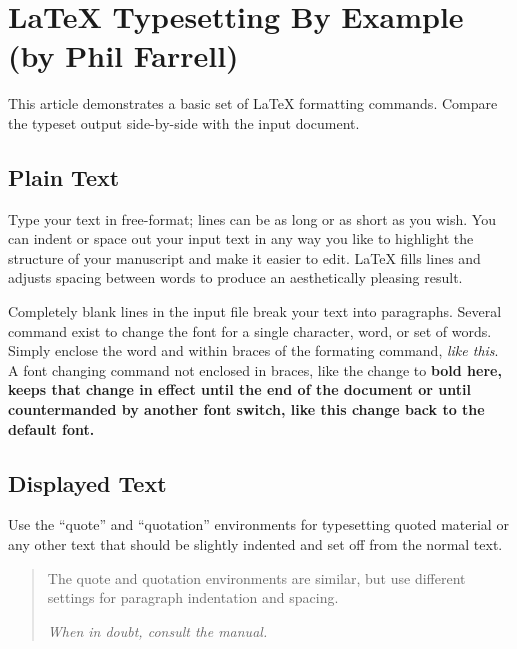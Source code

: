 %
\section{LaTeX Typesetting By Example (by Phil Farrell)}
This article demonstrates a basic set of LaTeX formatting commands.
Compare the typeset output side-by-side with the input document.

\subsection{Plain Text}
Type your text in free-format; lines can be as long
or as short
as you wish.
        You can indent         or space out
        your input 
            text in 
                any way you like to highlight the structure
        of your manuscript and make it easier to edit.
LaTeX fills lines and adjusts spacing between words to produce an
aesthetically pleasing result.

Completely blank lines in the input file break your text into
paragraphs.
Several command exist to change the font for a single character, word, or set of words. 
Simply enclose the word and within braces of the formating command, 
\emph{like this}.
A font changing command not enclosed in braces, like the change to \bfseries 
bold here, keeps that change in effect until the end of the document or
until countermanded by another font switch, like this change back to 
\normalfont the default font. 

\subsection{Displayed Text}
Use the ``quote'' and  ``quotation'' environments for typesetting quoted
material or any other text that should be slightly indented and set off
from the normal text.
\begin{quotation}
The quote and quotation environments are similar, but use different 
settings for paragraph indentation and spacing.

\em When in doubt, consult the manual.
\end{quotation}

